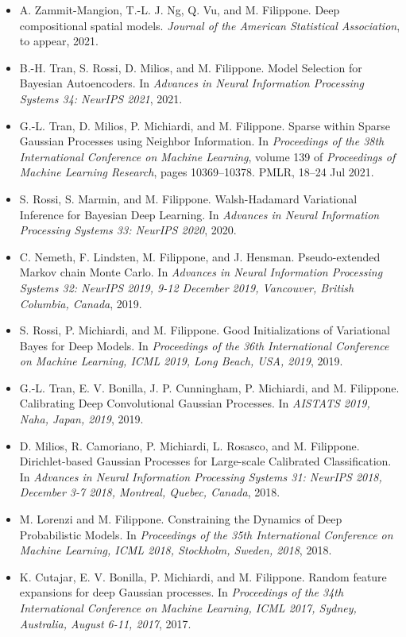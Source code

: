 \documentclass[a4paper,10pt]{article}
\begin{document}
\begin{itemize}
\item  A. Zammit-Mangion, T.-L. J. Ng, Q. Vu, and M. Filippone. Deep compositional spatial models. \emph{Journal of the American Statistical Association}, to appear, 2021.
\item  B.-H. Tran, S. Rossi, D. Milios, and M. Filippone. Model Selection for Bayesian Autoencoders. In \emph{Advances in Neural Information Processing Systems 34: NeurIPS 2021}, 2021.  
\item  G.-L. Tran, D. Milios, P. Michiardi, and M. Filippone. Sparse within Sparse Gaussian Processes using Neighbor Information. In \emph{Proceedings of the 38th International Conference on Machine Learning}, volume 139 of \emph{Proceedings of Machine Learning Research}, pages 10369--10378. PMLR, 18--24 Jul 2021.
\item  S. Rossi, S. Marmin, and M. Filippone. Walsh-Hadamard Variational Inference for Bayesian Deep Learning. In \emph{Advances in Neural Information Processing Systems 33: NeurIPS 2020}, 2020.  
\item  C. Nemeth, F. Lindsten, M. Filippone, and J. Hensman. Pseudo-extended Markov chain Monte Carlo. In \emph{Advances in Neural Information Processing Systems 32: NeurIPS 2019, 9-12 December 2019, Vancouver, British Columbia, Canada}, 2019.  
\item  S. Rossi, P. Michiardi, and M. Filippone. Good Initializations of Variational Bayes for Deep Models. In \emph{Proceedings of the 36th International Conference on Machine Learning, ICML 2019, Long Beach, USA, 2019}, 2019.  
\item  G.-L. Tran, E. V. Bonilla, J. P. Cunningham, P. Michiardi, and M. Filippone. Calibrating Deep Convolutional Gaussian Processes. In \emph{AISTATS 2019, Naha, Japan, 2019}, 2019.  
\item  D. Milios, R. Camoriano, P. Michiardi, L. Rosasco, and M. Filippone. Dirichlet-based Gaussian Processes for Large-scale Calibrated Classification. In \emph{Advances in Neural Information Processing Systems 31: NeurIPS 2018, December 3-7 2018, Montreal, Quebec, Canada}, 2018.  
\item  M. Lorenzi and M. Filippone. Constraining the Dynamics of Deep Probabilistic Models. In \emph{Proceedings of the 35th International Conference on Machine Learning, ICML 2018, Stockholm, Sweden, 2018}, 2018.  
\item  K. Cutajar, E. V. Bonilla, P. Michiardi, and M. Filippone. Random feature expansions for deep Gaussian processes. In \emph{Proceedings of the 34th International Conference on Machine Learning, ICML 2017, Sydney, Australia, August 6-11, 2017}, 2017.  

\end{itemize}
\end{document}
